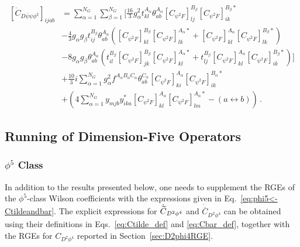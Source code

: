 \begin{align}
    \left[\dot C_{D\overline \psi \psi \phi^2}\right]_{ijab} &= 
    \sum_{\alpha=1}^{N_G} \sum_{\beta=1}^{N_G} 
    \Bigg[
    \frac{16}{3}g_\alpha^2 t^{A_\alpha}_{kl}\theta^{A_\alpha}_{ab}
    \left[C_{\psi^2 F}\right]_{lj}^{B_\beta} \left[C_{\psi^2 F}\right]_{ik}^{B_\beta *} 
    \nonumber\\
    &- \frac{4}{3}g_\alpha g_\beta t^{B_\beta}_{ij}\theta^{A_\alpha}_{ab} \left(
    \left[C_{\psi^2 F}\right]_{kl}^{B_\beta} \left[C_{\psi^2 F}\right]_{lk}^{A_\alpha *} + \left[C_{\psi^2 F}\right]_{kl}^{A_\alpha} \left[C_{\psi^2 F}\right]_{lk}^{B_\beta *} 
    \right) \nonumber \\
    &- 8 g_{\alpha} g_\beta \theta^{A_\alpha}_{ab}\left(
    t^{B_\beta}_{il}
    \left[C_{\psi^2 F}\right]_{jk}^{B_\beta}
    \left[C_{\psi^2 F}\right]_{kl}^{A_\alpha *}
    +
    t^{B_\beta}_{lj}
    \left[C_{\psi^2 F}\right]_{kl}^{A_\alpha}
    \left[C_{\psi^2 F}\right]_{ik}^{B_\beta *}
    \right)
    \Bigg] \nonumber \\
    &+\frac{10}{3}i\sum_{\alpha=1}^{N_G}  g_\alpha^2 f^{A_\alpha B_\alpha C_\alpha}\theta^{C_\alpha}_{ab}\left[C_{\psi^2 F}\right]_{ki}^{A_\alpha}
    \left[C_{\psi^2 F}\right]_{ik}^{B_\alpha *} \nonumber \\
    &+ \left(4\sum_{\alpha=1}^{N_G}
    y_{mjb}y^*_{ika} \left[C_{\psi^2 F}\right]_{kl}^{A_\alpha} \left[C_{\psi^2 F}\right]_{lm}^{A_\alpha *} - \left(a \leftrightarrow b\right)
    \right)\,.
\end{align}


\subsection{Running of Dimension-Five Operators}

\subsubsection{\texorpdfstring{$\phi^5$}{phi5} Class}

In addition to the results presented below, one needs to supplement the RGEs of the $\phi^5$-class Wilson coefficients with the expressions given in Eq.~\eqref{eq:phi5<-Ctildeandbar}.
The explicit expressions for $\dot{\widetilde{C}}_{D^2\phi^4}$ and $\dot{\overline C}_{D^2\phi^4}$ can be obtained using their definitions in Eqs.~\eqref{eq:Ctilde_def} and \eqref{eq:Cbar_def}, together with the RGEs for $C_{D^2\phi^4}$ reported in Section~\ref{sec:D2phi4RGE}.

